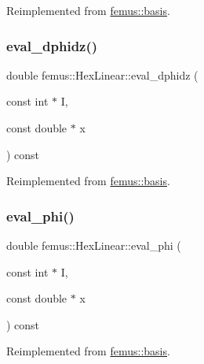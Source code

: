 Reimplemented from \mbox{\hyperlink{classfemus_1_1basis_a2819fac9aae797156b9efec8a0b85cc1}{femus\+::basis}}.

\mbox{\label{classfemus_1_1_hex_linear_aed97c1006402d186cebd957fc3e20896}} 
\subsubsection{\texorpdfstring{eval\+\_\+dphidz()}{eval\_dphidz()}}
{\footnotesize\ttfamily double femus\+::\+Hex\+Linear\+::eval\+\_\+dphidz (\begin{DoxyParamCaption}\item[{const int $\ast$}]{I,  }\item[{const double $\ast$}]{x }\end{DoxyParamCaption}) const\hspace{0.3cm}{\ttfamily [virtual]}}



Reimplemented from \mbox{\hyperlink{classfemus_1_1basis_affd9927f6e25e264108219d862b8cb3d}{femus\+::basis}}.

\mbox{\label{classfemus_1_1_hex_linear_ab6def48278382bd3f39856d158f08287}} 
\subsubsection{\texorpdfstring{eval\+\_\+phi()}{eval\_phi()}}
{\footnotesize\ttfamily double femus\+::\+Hex\+Linear\+::eval\+\_\+phi (\begin{DoxyParamCaption}\item[{const int $\ast$}]{I,  }\item[{const double $\ast$}]{x }\end{DoxyParamCaption}) const\hspace{0.3cm}{\ttfamily [virtual]}}



Reimplemented from \mbox{\hyperlink{classfemus_1_1basis_a89b0797cdccffae5ff6d059b32016ae5}{femus\+::basis}}.

\mbox{\label{classfemus_1_1_hex_linear_a6b28eaf73e48af3bf32ddd31991ec35e}} 
